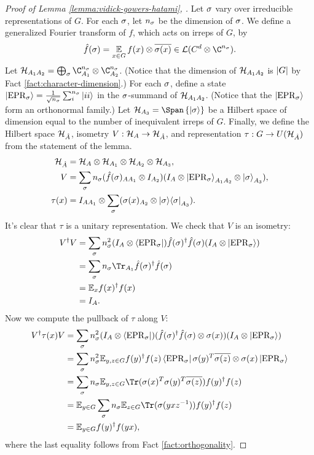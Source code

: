 \begin{proof}[Proof of Lemma \ref{lemma:vidick-gowers-hatami}, \cite{vidick2017approx}]
	Let $\sigma$ vary over irreducible representations of $G$. For each $\sigma$, let $n_\sigma$ be the dimension of $\sigma$.
	We define a generalized Fourier transform of $f$, which acts on irreps of $G$, by 
	\begin{equation}
		\hat f(\s) = \E{x\in G} f(x) \otimes \bar {\s (x)} \in \m L(C^d\otimes \C^{n_\s}).
	\end{equation}
	Let $\m H_{A_1A_2} = \bigoplus_\s \C^{n_\s}_{A_1}\otimes \C^{n_\s}_{A_2}$. (Notice that the dimension of $\mathcal H_{A_1A_2}$ is $\left\vert G\right\vert$ by Fact \ref{fact:character-dimension}.) For each $\sigma$, define a state $\ket{\mathrm{EPR}_\sigma} = \frac1{\sqrt {n_\sigma}}\sum_i^{n_\sigma}\ket{ii}$ in the $\sigma$-summand of $\mathcal H_{A_1A_2}$. (Notice that the $\ket{\mathrm{EPR}_\sigma}$ form an orthonormal family.)
	Let $\m H_{A_3} = \Span\set{\ket \s}$ be a Hilbert space of dimension equal to the number of inequivalent irreps of $G$. Finally, we define the Hilbert space $\mathcal H_{\hat A}$, isometry $V: \mathcal H_A \to \mathcal H_{\hat A}$, and representation $\tau: G\to U(\mathcal H_{\hat A})$ from the statement of the lemma. 
	\begin{align}
		{\mathcal H}_{\hat A} &= {\mathcal H}_A\otimes {\mathcal H}_{A_1}\otimes {\mathcal H}_{A_2}\otimes {\mathcal H}_{A_3},
		\\V &= \sum_\sigma n_\sigma(\hat f(\sigma)_{AA_1}\otimes I_{A_2})(I_A\otimes \ket{{\mathrm{EPR}_\sigma}}_{A_1A_2}\otimes \ket{\sigma}_{A_3}),
		\\\tau(x) &= I_{AA_1} \otimes \sum_\sigma (\sigma(x)_{A_2} \otimes \ket{\sigma}\!\bra{\sigma}_{A_3}).
	\end{align}
	It's clear that $\tau$ is a unitary representation. We check that $V$ is an isometry:
	\begin{align}
		V^\dagger V 
		&= \sum_\s n_{\s}^2(I_A \otimes \bra\eprrho)\hat f (\s)^\dagger \hat f(\s)(I_A\otimes \ket\eprrho)
		\\&= \sum_\s n_{\s} \Tr_{A_1}\hat f (\s)^\dagger \hat f(\s)
		\\&= \b E_x f (x)^\dagger  f(x) 
		\\&= I_A.
	\end{align}
	Now we compute the pullback of $\tau$ along $V$:
	\begin{align}
		V^\dagger \tau(x) V 
		&= \sum_\s n_{\s}^2(I_A \otimes \bra\eprrho) (\hat f (\s)^\dagger \hat f(\s) \otimes \s(x))(I_A\otimes \ket\eprrho)
		\\&= \sum_\s n_{\s}^2 \b E_{y,z\in G}f(y)^\dagger f(z)\bra\eprrho\s(y)^T\bar{\s(z)} \otimes \s(x) \ket\eprrho
		\\&= \sum_\s n_{\s}  \b E_{y,z\in G} \Tr(\s(x)^T\s(y)^T\bar{\s(z)})f(y)^\dagger f(z)
		\\&= \b E_{y\in G}\sum_\s n_{\s}   \b E_{z\in G}\Tr(\s(yxz\1))f(y)^\dagger f(z)
		\\&= \b E_{y\in G} f(y)^\dagger f(yx),
	\end{align}
	where the last equality follows from Fact \ref{fact:orthogonality}. 
	

\end{proof}
